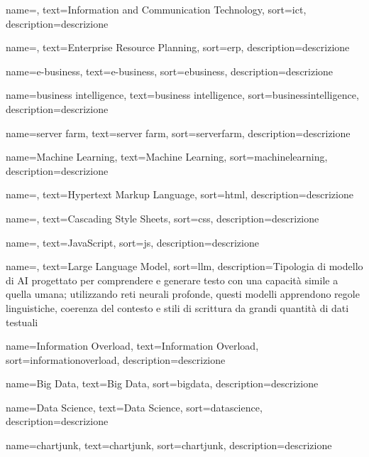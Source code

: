  {
    name=,
    text=Information and Communication Technology,
    sort=ict,
    description={descrizione}
}

 {
    name=,
    text=Enterprise Resource Planning,
    sort=erp,
    description={descrizione}
}

 {
    name=e-business,
    text=e-business,
    sort=ebusiness,
    description={descrizione}
}

 {
    name=business intelligence,
    text=business intelligence,
    sort=businessintelligence,
    description={descrizione}
}

 {
    name=server farm,
    text=server farm,
    sort=serverfarm,
    description={descrizione}
}

 {
    name=Machine Learning,
    text=Machine Learning,
    sort=machinelearning,
    description={descrizione}
}

 {
    name=,
    text=Hypertext Markup Language,
    sort=html,
    description={descrizione}
}

 {
    name=,
    text=Cascading Style Sheets,
    sort=css,
    description={descrizione}
}

 {
    name=,
    text=JavaScript,
    sort=js,
    description={descrizione}
}

 {
    name=,
    text=Large Language Model,
    sort=llm,
    description={Tipologia di modello di AI progettato per comprendere e
    generare testo con una capacità simile a quella umana; utilizzando reti neurali
    profonde, questi modelli apprendono regole linguistiche, coerenza del contesto e
    stili di scrittura da grandi quantità di dati testuali}
}

 {
    name=Information Overload,
    text=Information Overload,
    sort=informationoverload,
    description={descrizione}
}

 {
    name=Big Data,
    text=Big Data,
    sort=bigdata,
    description={descrizione}
}

 {
    name=Data Science,
    text=Data Science,
    sort=datascience,
    description={descrizione}
}

 {
    name=chartjunk,
    text=chartjunk,
    sort=chartjunk,
    description={descrizione}
}

